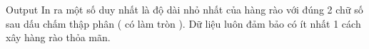 Output
In ra một số duy nhất là độ dài nhỏ nhất của hàng rào với đúng 2 chữ số sau dấu chấm thập phân ( có làm tròn ). Dữ liệu luôn đảm bảo có ít nhất 1 cách xây hàng rào thỏa mãn.